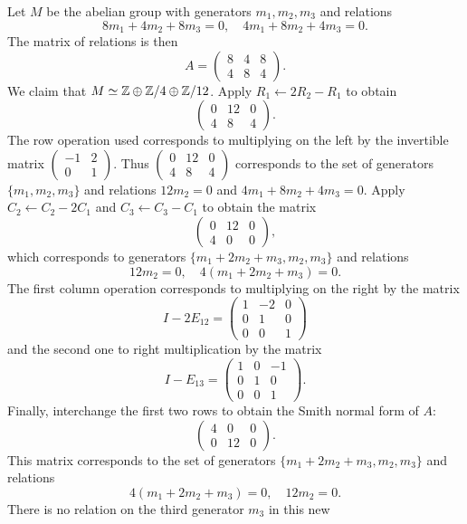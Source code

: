 \begin{example}
Let $M$ be the abelian group with generators $m_1,m_2,m_3$ and relations 
\[ 
8m_1+4m_2+8m_3=0, 
\quad 
4m_1+8m_2+4m_3=0.
\]
The matrix of relations is then 
\[
A=\begin{pmatrix}
8 & 4 & 8\\
4 & 8 & 4
\end{pmatrix}.
\]	
We claim that 
$M\simeq\mathbb{Z}\oplus\mathbb{Z}/4\oplus\mathbb{Z}/12$.
Apply 
$R_1\leftarrow 2R_2-R_1$ to obtain 
\[
\begin{pmatrix}
0 & 12 & 0\\
4 & 8 & 4	
\end{pmatrix}. 
\]
The row operation used corresponds to multiplying on the left by the 
invertible matrix $\begin{pmatrix}-1&2\\0&1\end{pmatrix}$. Thus 
$\begin{pmatrix}
0 & 12 & 0\\
4 & 8 & 4	
\end{pmatrix}$
corresponds to the set of generators 
$\{m_1,m_2,m_3\}$ and relations $12m_2=0$ and $4m_1+8m_2+4m_3=0$.
Apply $C_2\leftarrow C_2-2C_1$ and $C_3\leftarrow C_3-C_1$ to obtain 
the matrix
\[
\begin{pmatrix}
0 & 12 & 0\\
4 & 0 & 0	
\end{pmatrix},
\]
which corresponds to generators $\{m_1+2m_2+m_3,m_2,m_3\}$ 
and relations 
\[ 
12m_2=0,\quad 
4(m_1+2m_2+m_3)=0.
\]
The first column operation
corresponds to multiplying on the right by 
the matrix 
\[ 
I-2E_{12}=\begin{pmatrix}1&-2&0\\0&1&0\\0&0&1\end{pmatrix}
\]
and
the second one to right multiplication by the matrix
\[ 
I-E_{13}=\begin{pmatrix}1&0&-1\\0&1&0\\0&0&1\end{pmatrix}.
\]
Finally, interchange the first two rows to obtain
the Smith normal form of $A$: 
\[
\begin{pmatrix}
4 & 0 & 0\\
0 & 12 & 0	
\end{pmatrix}.
\]
This matrix corresponds to 
the set of generators $\{m_1+2m_2+m_3,m_2,m_3\}$ and relations 
\[ 
4(m_1+2m_2+m_3)=0,\quad 
12m_2=0.
\]
There is no relation on the third generator $m_3$ in this new

\end{example}
